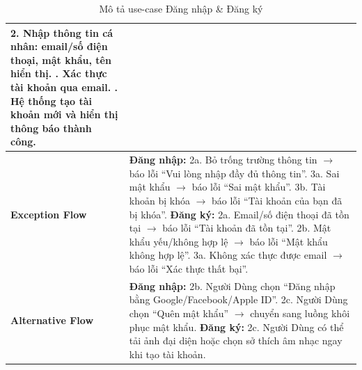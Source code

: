 \documentclass[a4paper]{article}
\begin{document}
\begin{table}[H]
\begin{tabularx}{\textwidth}{|l|X|}
		2. Nhập thông tin cá nhân: email/số điện thoại, mật khẩu, tên hiển thị. \newline
		3. Xác thực tài khoản qua email. \newline
		4. Hệ thống tạo tài khoản mới và hiển thị thông báo thành công.                                                                                                                        \\ \hline
		\textbf{Exception Flow}
		                       & \textbf{Đăng nhập:} \newline
		2a. Bỏ trống trường thông tin $\rightarrow$ báo lỗi “Vui lòng nhập đầy đủ thông tin”. \newline
		3a. Sai mật khẩu $\rightarrow$ báo lỗi “Sai mật khẩu”. \newline
		3b. Tài khoản bị khóa $\rightarrow$ báo lỗi “Tài khoản của bạn đã bị khóa”.
		\textbf{Đăng ký:} \newline
		2a. Email/số điện thoại đã tồn tại $\rightarrow$ báo lỗi “Tài khoản đã tồn tại”. \newline
		2b. Mật khẩu yếu/không hợp lệ $\rightarrow$ báo lỗi “Mật khẩu không hợp lệ”. \newline
		3a. Không xác thực được email $\rightarrow$ báo lỗi “Xác thực thất bại”.                                                                                                               \\ \hline
		\textbf{Alternative Flow}
		                       & \textbf{Đăng nhập:} \newline
		2b. Người Dùng chọn “Đăng nhập bằng Google/Facebook/Apple ID”. \newline
		2c. Người Dùng chọn “Quên mật khẩu” $\rightarrow$ chuyển sang luồng khôi phục mật khẩu. \newline
		\textbf{Đăng ký:} \newline
		2c. Người Dùng có thể tải ảnh đại diện hoặc chọn sở thích âm nhạc ngay khi tạo tài khoản.                                                                                              \\ \hline
	\end{tabularx}
	\caption{Mô tả use-case Đăng nhập \& Đăng ký}
\end{table}

\end{document}
